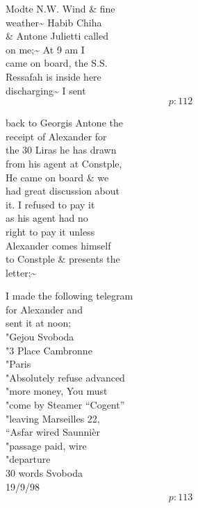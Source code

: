 \documentclass{report}
\begin{document}
	\par{
 	Modte N.W. Wind \& fine\ \\weather\~{} Habib Chiha\ \\\& Antone Julietti called\ \\on me;\~{} At 9 am I\ \\came on board, the S.S.\ \\Ressafah is inside here\ \\discharging\~{} I sent\ \\
  \[p: 112 \]

	}

	\par{
 	back to Georgis Antone the\ \\receipt of Alexander for\ \\the 30 Liras he has drawn\ \\from his agent at Constple,\ \\He came on board \& we\ \\had great discussion about\ \\it. I refused to pay it\ \\as his agent had no\ \\right to pay it unless\ \\Alexander comes himself\ \\to Constple \& presents the\ \\letter;\~{}\ \\
	}

	\par{
 	I made the following telegram\ \\for Alexander and\ \\sent it at noon;\ \\"Gejou Svoboda\ \\"3 Place Cambronne\ \\"Paris\ \\"Absolutely refuse advanced\ \\"more money, You must\ \\"come by Steamer “Cogent”\ \\"leaving Marseilles 22,\ \\“Asfar wired Saunnièr\ \\"passage paid, wire\ \\"departure\ \\30 words Svoboda\ \\19/9/98\ \\
  \[p: 113 \]

	}

\end{document}
